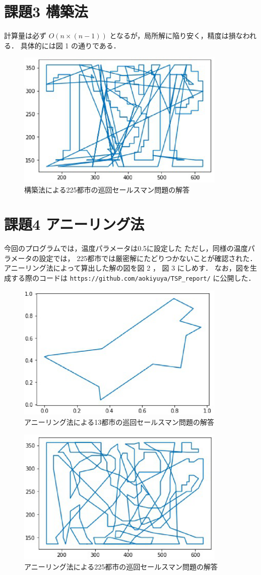 \documentclass{jsarticle}
\begin{document}
\section{課題3 構築法}
計算量は必ず
$O(n \times (n - 1) )$
となるが，局所解に陥り安く，精度は損なわれる．
具体的には図 1 の通りである．


\begin{figure}[ptb]
  \centering
    \includegraphics[width=100mm]{CM225.eps}
	\caption{構築法による225都市の巡回セールスマン問題の解答}
\end{figure}

\section{課題4 アニーリング法}
今回のプログラムでは，温度パラメータは0.5に設定した
ただし，同様の温度パラメータの設定では，
225都市では厳密解にたどりつかないことが確認された．
アニーリング法によって算出した解の図を図 2 ， 図 3 にしめす．
なお，図を生成する際のコードは
\verb#https://github.com/aokiyuya/TSP_report/#
に公開した．

\begin{figure}[ptb]
  \centering
    \includegraphics[width=100mm]{SA13.eps}
	\caption{アニーリング法による13都市の巡回セールスマン問題の解答}
\end{figure}


\begin{figure}[ptb]
  \centering
    \includegraphics[width=100mm]{SA225.eps}
	\caption{アニーリング法による225都市の巡回セールスマン問題の解答}
\end{figure}
\end{document}
